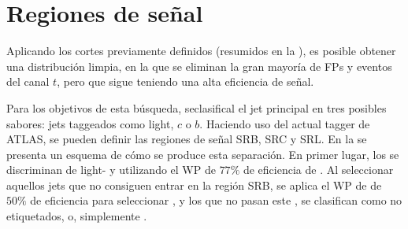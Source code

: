 \section{Regiones de señal}
\label{sec:evt_selection:sr}


Aplicando los cortes previamente definidos (resumidos en la \Tab{\ref{fig:evt_selection:sr:signal_regions_scheme}}), es posible obtener una distribución \myj limpia, en la que se eliminan la gran mayoría de \acp{FP} y eventos del canal \(t\), pero que sigue teniendo una alta eficiencia de señal.

Para los objetivos de esta búsqueda, seclasifical el jet principal en tres posibles sabores: jets taggeados como light, \(c\) o \(b\). Haciendo uso del actual tagger de \ac{ATLAS}, se pueden definir las regiones de señal SRB, SRC y SRL. En la \Fig{\ref{fig:evt_selection:sr:signal_regions_scheme}} se presenta un esquema de cómo se produce esta separación. En primer lugar, los \bjets se discriminan de light- y \cjets utilizando el \ac{WP} de \(77\%\) de eficiencia de \btagging. Al seleccionar aquellos jets que no consiguen entrar en la región SRB, se aplica el \ac{WP} de \ctagging de \(50\%\) de eficiencia para seleccionar \cjets, y los que no pasan este \ctagger, se clasifican como no etiquetados, o, simplemente \ljets.

